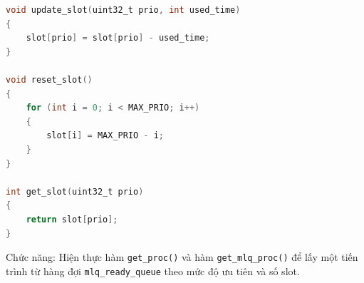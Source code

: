 \begin{lstlisting}[style=Cstyle,language=C]
void update_slot(uint32_t prio, int used_time)
{
    slot[prio] = slot[prio] - used_time;
}

void reset_slot()
{
    for (int i = 0; i < MAX_PRIO; i++)
    {
        slot[i] = MAX_PRIO - i;
    }
}

int get_slot(uint32_t prio)
{
    return slot[prio];
}
\end{lstlisting}


Chức năng: Hiện thực hàm \texttt{get\_proc()} và hàm \texttt{get\_mlq\_proc()} để lấy một tiến trình từ hàng đợi \texttt{mlq\_ready\_queue} theo mức độ ưu tiên và số slot.

